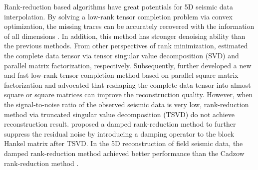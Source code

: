 Rank-reduction based algorithms have great potentials for 5D seismic data interpolation. 
By solving a low-rank tensor completion problem via convex optimization, the missing traces can be accurately recovered with the information of all dimensions \citep{Kreimer2013}. In addition, this method has stronger denoising ability than the previous methods. From other perspectives of rank minimization, \cite{Ely2015} estimated the complete data tensor via tensor singular value decomposition (SVD) and parallel matrix factorization, respectively. Subsequently, \cite{GaoJianjun2017} further developed a new and fast low-rank tensor completion method based on parallel square matrix factorization and advocated that reshaping the complete data tensor into almost square or square matrices can improve the reconstruction quality. However, when the signal-to-noise ratio of the observed seismic data is very low,  rank-reduction method via truncated singular value decomposition (TSVD) do not achieve  reconstruction result. \cite{yangkang2016irr5d} proposed a damped rank-reduction method to further suppress the residual noise by introducing a damping operator to the block Hankel matrix after TSVD. In the 5D reconstruction of field seismic data, the damped rank-reduction method achieved better performance than the Cadzow rank-reduction method \citep{Trickett2009, mssa}.  

